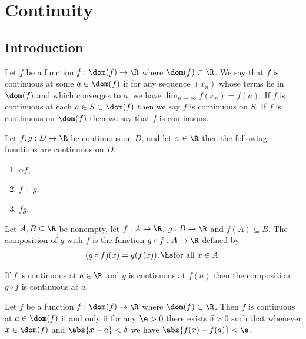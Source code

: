 \documentclass{article}
\begin{document}
\section{Continuity}


\subsection{Introduction}

\begin{definition}
    Let $f$ be a function $f:\dom(f)\to\R$ where $\dom(f)\subset\R$.
    We say that $f$ is continuous at some $a\in\dom(f)$ if for any
    sequence $(x_n)$ whose terms lie in $\dom(f)$ and which converges
    to $a$, we have $\lim_{n\to\infty}f(x_n)=f(a)$. If $f$ is continuous
    at each $a\in S\subset\dom(f)$ then we say $f$ is continuous on $S$.
    If $f$ is continuous on $\dom(f)$ then we say that $f$ is continuous.
\end{definition}

\setcounter{theorem}{2}
\begin{theorem}
    Let $f,g:D\to\R$ be continuous on $D$, and let $\alpha\in\R$ then the
    following functions are continuous on $D$. 
    \begin{enumerate}
        \item $\alpha f$,
        \item $f+g$,
        \item $fg$.
    \end{enumerate}
\end{theorem}

\begin{definition}
    Let $A,B\subseteq \R$ be nonempty, let $f:A\to\R$, $g:B\to\R$ and
    $f(A)\subseteq B$. The composition of $g$ with $f$ is the function
    $g\circ f:A\to\R$ defined by
    \begin{align*}
        (g\circ f)(x) = g(f(x)),\hs\text{for all }x\in A.
    \end{align*}
\end{definition}

\begin{theorem}
    If $f$ is continuous at $a\in\R$ and $g$ is continuous at $f(a)$ then
    the composition $g\circ f$ is continuous at $a$.
\end{theorem}

\begin{theorem}
    Let $f$ be a function $f:\dom(f)\to\R$ where $\dom(f) \subset\R$.
    Then $f$ is continuous at $a\in\dom(f)$ if and only if for any
    $\e>0$ there exists $\delta>0$ such that whenever $x\in\dom(f)$
    and $\abs{x-a}<\delta$ we have $\abs{f(x)-f(a)}<\e$.
\end{theorem}
\end{document}
